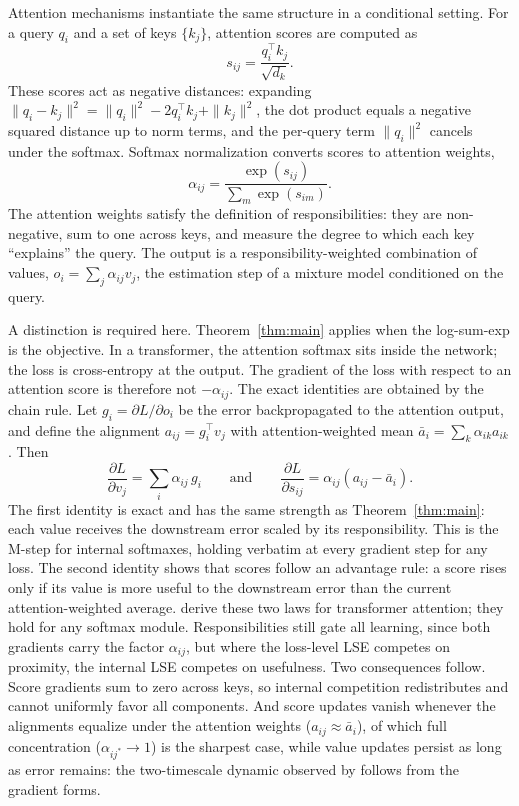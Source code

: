 Attention mechanisms instantiate the same structure in a conditional setting. For a query $q_i$ and a set of keys $\{k_j\}$, attention scores are computed as
\[
s_{ij} = \frac{q_i^\top k_j}{\sqrt{d_k}}.
\]
These scores act as negative distances: expanding $\|q_i - k_j\|^2 = \|q_i\|^2 - 2 q_i^\top k_j + \|k_j\|^2$, the dot product equals a negative squared distance up to norm terms, and the per-query term $\|q_i\|^2$ cancels under the softmax. Softmax normalization converts scores to attention weights,
\[
\alpha_{ij} = \frac{\exp(s_{ij})}{\sum_m \exp(s_{im})}.
\]
The attention weights satisfy the definition of responsibilities: they are non-negative, sum to one across keys, and measure the degree to which each key ``explains'' the query. The output is a responsibility-weighted combination of values, $o_i = \sum_j \alpha_{ij} v_j$, the estimation step of a mixture model conditioned on the query.

A distinction is required here. Theorem~\ref{thm:main} applies when the log-sum-exp is the objective. In a transformer, the attention softmax sits inside the network; the loss is cross-entropy at the output. The gradient of the loss with respect to an attention score is therefore not $-\alpha_{ij}$. The exact identities are obtained by the chain rule. Let $g_i = \partial L / \partial o_i$ be the error backpropagated to the attention output, and define the alignment $a_{ij} = g_i^\top v_j$ with attention-weighted mean $\bar{a}_i = \sum_k \alpha_{ik} a_{ik}$. Then
\begin{equation}
\frac{\partial L}{\partial v_j} = \sum_i \alpha_{ij} \, g_i
\qquad \text{and} \qquad
\frac{\partial L}{\partial s_{ij}} = \alpha_{ij} \left( a_{ij} - \bar{a}_i \right).
\end{equation}
The first identity is exact and has the same strength as Theorem~\ref{thm:main}: each value receives the downstream error scaled by its responsibility. This is the M-step for internal softmaxes, holding verbatim at every gradient step for any loss. The second identity shows that scores follow an advantage rule: a score rises only if its value is more useful to the downstream error than the current attention-weighted average. \citet{agarwal2025gradient} derive these two laws for transformer attention; they hold for any softmax module. Responsibilities still gate all learning, since both gradients carry the factor $\alpha_{ij}$, but where the loss-level LSE competes on proximity, the internal LSE competes on usefulness. Two consequences follow. Score gradients sum to zero across keys, so internal competition redistributes and cannot uniformly favor all components. And score updates vanish whenever the alignments equalize under the attention weights ($a_{ij} \approx \bar{a}_i$), of which full concentration ($\alpha_{ij^*} \to 1$) is the sharpest case, while value updates persist as long as error remains: the two-timescale dynamic observed by \citet{agarwal2025gradient} follows from the gradient forms.

